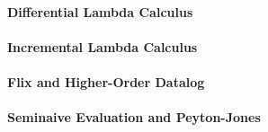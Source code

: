 \paragraph{Differential Lambda Calculus}

\paragraph{Incremental Lambda Calculus}

\paragraph{Flix and Higher-Order Datalog}

\paragraph{Seminaive Evaluation and Peyton-Jones}